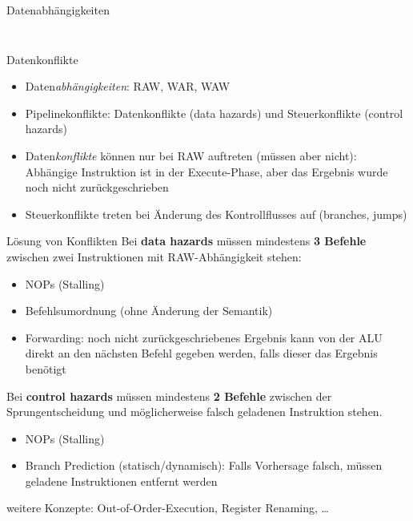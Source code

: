 \documentclass[
  german,            %
  aspectratio=169,    %
]{tumbeamer}
\begin{document}
\begin{frame}[c, fragile]{Datenabhängigkeiten}{}
\begin{columns}[c]
\begin{column}{0.3\textwidth}
{{\begin{enumerate}[i.]
			\end{enumerate}
			}
			\vspace{\baselineskip}
			}
		\end{column}
	\end{columns}
\end{frame}

\begin{frame}[c, fragile]{Datenkonflikte}{}
	\begin{itemize}
		\item Daten\textit{abhängigkeiten}: RAW, WAR, WAW
		\item Pipelinekonflikte: Datenkonflikte (data hazards) und Steuerkonflikte (control hazards)
		\item Daten\textit{konflikte} können nur bei RAW auftreten (müssen aber nicht): Abhängige Instruktion ist in der Execute-Phase, aber das Ergebnis wurde noch nicht zurückgeschrieben
		\item Steuerkonflikte treten bei Änderung des Kontrollflusses auf (branches, jumps)
	\end{itemize}
\end{frame}

\begin{frame}[c, fragile]{Lösung von Konflikten}
	Bei \textbf{data hazards} müssen mindestens \textbf{3 Befehle} zwischen zwei Instruktionen mit RAW-Abhängigkeit stehen:
	\begin{itemize}
		\item NOPs (Stalling)
		\item Befehlsumordnung (ohne Änderung der Semantik)
		\item Forwarding: noch nicht zurückgeschriebenes Ergebnis kann von der ALU direkt an den nächsten Befehl gegeben werden, falls dieser das Ergebnis benötigt
	\end{itemize}
	\vspace{0.5cm}
	Bei \textbf{control hazards} müssen mindestens \textbf{2 Befehle} zwischen der Sprungentscheidung und möglicherweise falsch geladenen Instruktion stehen.
	\begin{itemize}
		\item NOPs (Stalling)
		\item Branch Prediction (statisch/dynamisch): Falls Vorhersage falsch, müssen geladene Instruktionen entfernt werden
	\end{itemize}
	\vspace{0.5cm}
	weitere Konzepte: Out-of-Order-Execution, Register Renaming, \ldots
\end{frame}
\end{document}

